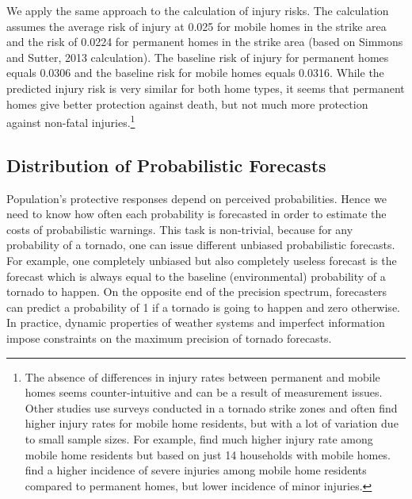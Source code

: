 \documentclass{ametsocV6.1}
\begin{document}
We apply the same approach to the calculation of injury risks. The calculation assumes the average risk of injury at 0.025 for mobile homes in the strike area and the risk of 0.0224 for permanent homes in the strike area (based on Simmons and Sutter, 2013 calculation). The baseline risk of injury for permanent homes equals 0.0306 and the baseline risk for mobile homes equals 0.0316. While the predicted injury risk is very similar for both home types, it seems that permanent homes give better protection against death, but not much more protection against non-fatal injuries.\footnote{The absence of differences in injury rates between permanent and mobile homes seems counter-intuitive and can be a result of measurement issues. Other studies use surveys conducted in a tornado strike zones and often find higher injury rates for mobile home residents, but with a lot of variation due to small sample sizes. For example, \citet{glass_injuries_1980} find much higher injury rate among mobile home residents but based on just 14 households with mobile homes. \citet{daley_risk_2005} find a higher incidence of severe injuries among mobile home residents compared to permanent homes, but lower incidence of minor injuries.}  


\vspace{10pt}
\subsection{Distribution of Probabilistic Forecasts} 
Population's protective responses depend on perceived probabilities. Hence we need to know how often each probability is forecasted in order to estimate the costs of probabilistic warnings. This task is non-trivial, because for any probability of a tornado, one can issue different unbiased probabilistic forecasts. For example, one completely unbiased but also completely useless forecast is the forecast which is always equal to the baseline (environmental) probability of a tornado to happen. On the opposite end of the precision spectrum, forecasters can predict a probability of 1 if a tornado is going to happen and zero otherwise. In practice, dynamic properties of weather systems and imperfect information impose constraints on the maximum precision of tornado forecasts.
\end{document}
